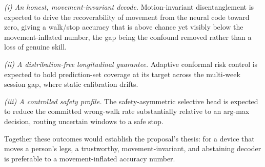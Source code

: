 \documentclass[journal]{IEEEtran}
\begin{document}
\emph{(i) An honest, movement-invariant decode.} Motion-invariant disentanglement is
expected to drive the recoverability of movement from the neural code toward zero,
giving a walk/stop accuracy that is above chance yet visibly below the
movement-inflated number, the gap being the confound removed rather than a loss of
genuine skill.

\emph{(ii) A distribution-free longitudinal guarantee.} Adaptive conformal risk
control is expected to hold prediction-set coverage at its target across the
multi-week session gap, where static calibration drifts.

\emph{(iii) A controlled safety profile.} The safety-asymmetric selective head is
expected to reduce the committed wrong-walk rate substantially relative to an arg-max
decision, routing uncertain windows to a safe stop.

Together these outcomes would establish the proposal's thesis: for a device that moves
a person's legs, a trustworthy, movement-invariant, and abstaining decoder is
preferable to a movement-inflated accuracy number.
\end{document}
